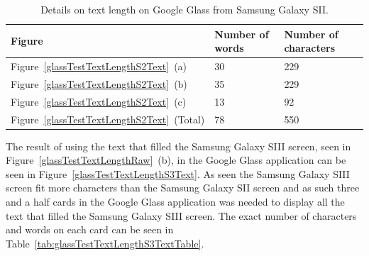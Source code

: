 	\begin{table}[ht!]
    		\caption{Details on text length on Google Glass from Samsung Galaxy SII.} \label{tab:glassTestTextLengthS2TextTable}
		\centering \begin{tabularx}{\textwidth}{l|X|X} \hline
		\textbf{Figure} & \textbf{Number of words} & \textbf{Number of characters} \\ \hline \hline
       
		Figure~\ref{glassTestTextLengthS2Text}~(a)	&30	&229	\\ \hline
		Figure~\ref{glassTestTextLengthS2Text}~(b)	&35	&229	\\ \hline
		Figure~\ref{glassTestTextLengthS2Text}~(c)	&13	&92	\\ \hline
		Figure~\ref{glassTestTextLengthS2Text}~(Total)	&78	&550	\\ \hline
		
		\end{tabularx}
	\end{table}

The result of using the text that filled the Samsung Galaxy SIII screen, seen in Figure~\ref{glassTestTextLengthRaw}~(b), in the Google Glass application can be seen in Figure~\ref{glassTestTextLengthS3Text}. As seen the Samsung Galaxy SIII screen fit more characters than the Samsung Galaxy SII screen and as such three and a half cards in the Google Glass application was needed to display all the text that filled the Samsung Galaxy SIII screen. The exact number of characters and words on each card can be seen in Table~\ref{tab:glassTestTextLengthS3TextTable}.

